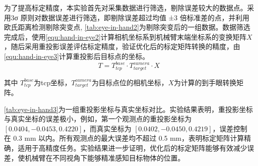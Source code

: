 \begin{table}[htbp]
	\caption[用于计算手眼变换矩阵的观测数据]{用于计算手眼变换矩阵的观测数据}
	\label{tab:eye-in-hand2}
\end{table}
为了提高标定精度，本实验首先对采集数据进行筛选，剔除误差较大的数据点。采用3σ 原则对数据误差进行筛选，即剔除误差超过均值 ±3 倍标准差的点，并利用欧氏距离检测剔除突变点, \cref{tab:eye-in-hand2}为剔除突变后的一组数据。数据筛选完成后，使用\cref{equ:hand-in-eye2}计算相机坐标系到机械臂末端坐标系的变换矩阵$X$，随后采用重投影误差评估标定精度，验证优化后的标定矩阵转换的精度，由\cref{equ:hand-in-eye3}计算重投影后目标点的坐标。
\begin{equation}
	\label{equ:hand-in-eye3}
	T = T_{tcp}^{base} \cdot T_{target}^{camera} \cdot X
\end{equation}

其中 $T_{tcp}^{base}$为tcp坐标，$T_{target}^{camera}$为目标点位的相机坐标，$X$为计算的到手眼转换矩阵。

\begin{table}[htbp]
	\caption[重投影坐标与真实坐标对比]{重投影坐标与真实坐标对比}
	\label{tab:eye-in-hand3}
\end{table}
 \cref{tab:eye-in-hand3}为一组重投影坐标与真实坐标对比。实验结果表明，重投影坐标与真实坐标的误差极小，例如，第一个观测点的重投影坐标为 $[0.0404, -0.0453, 0.4220]$，而真实坐标为 $[0.0402, -0.0450, 0.4219]$，误差控制在 0.3 mm 以内。所有观测点的最大误差均不超过 0.5 mm，表明标定矩阵计算精确，适用于高精度任务。实验结果进一步证明，优化后的标定矩阵能够有效减少误差，使机械臂在不同视角下能够精准感知目标物体的位置。